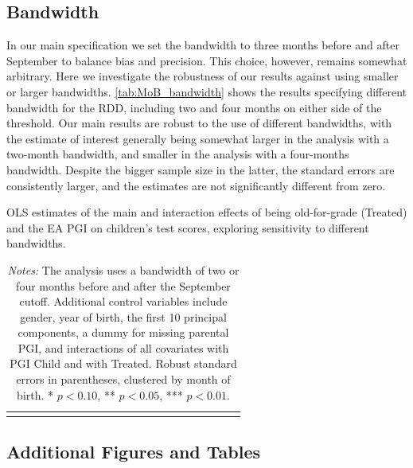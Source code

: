 \documentclass[12pt,a4paper]{article}
\begin{document}
\begin{bibunit}
\subsection{Bandwidth}
In our main specification we set the bandwidth to three months before and after September to balance bias and precision. This choice, however, remains somewhat arbitrary. Here we investigate the robustness of our results against using smaller or larger bandwidths. \autoref{tab:MoB_bandwidth} shows the results specifying different bandwidth for the RDD, including two and four months on either side of the threshold. Our main results are robust to the use of different bandwidths, with the estimate of interest generally being somewhat larger in the analysis with a two-month bandwidth, and smaller in the analysis with a four-months bandwidth. Despite the bigger sample size in the latter, the standard errors are consistently larger, and the estimates are not significantly different from zero.

\addtolength{\tabcolsep}{-0.15em}
\begin{table}[h]
\caption{OLS estimates of the main and interaction effects of being old-for-grade (Treated) and the EA
PGI on children’s test scores, exploring sensitivity to different bandwidths.}
\centering
{\scriptsize
\begin{tabular}{lcccccccccccccccccccc}
\toprule

\bottomrule
\addlinespace[.75ex]
\end{tabular}
\label{tab:MoB_bandwidth}
}
\caption*{\scriptsize \noindent \textit{Notes:} The analysis uses a bandwidth of two or four months before and after the September cutoff. Additional control variables include gender, year of birth, the first 10 principal components, a dummy for missing parental PGI, and interactions of all covariates with PGI Child and with Treated. Robust standard errors in parentheses, clustered by month of birth. * $p < 0.10$, ** $p < 0.05$, *** $p < 0.01$.}
\end{table}


\clearpage
\begin{landscape}
\section{Additional Figures and Tables} 
\renewcommand{\thetable}{G.\arabic{table}}
\renewcommand{\thefigure}{G.\arabic{figure}}
\renewcommand{\theequation}{G.\arabic{equation}}
\setcounter{table}{0} 
\setcounter{figure}{0} 
\setcounter{equation}{0} 
\label{appsec:MoreTabFig}


\end{landscape}
\end{bibunit}
\end{document}
